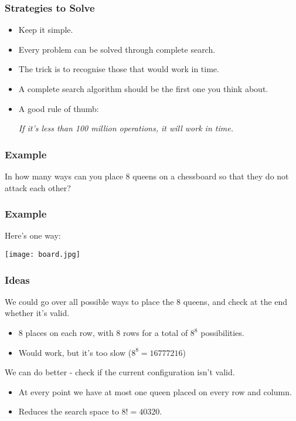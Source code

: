 \documentclass{beamer}
\begin{document}
\begin{frame}
    \frametitle{Strategies to Solve}
    \begin{itemize}
            \pause
        \item Keep it simple.
            \pause
        \item Every problem can be solved through complete search.
            \pause
        \item The trick is to recognise those that would work in time.
            \pause
        \item A complete search algorithm should be the first one you think about.
            \pause
        \item A good rule of thumb:

            \pause
        \vspace{5mm}
        \emph{If it's less than 100 million operations, it will work in time.}
    \end{itemize}
\end{frame}

\begin{frame}
    \frametitle{Example}
    \Large In how many ways can you place 8 queens on a chessboard so that they do not attack each other?

\end{frame}

\begin{frame}
    \frametitle{Example}
    Here's one way:

    \begin{center}
        \texttt{[image: board.jpg]}
    \end{center}
\end{frame}

\begin{frame}
    \frametitle{Ideas}

    We could go over all possible ways to place the 8 queens, and check at the end whether it's valid.
    
    \begin{itemize}
            \pause
        \item 8 places on each row, with 8 rows for a total of $8^8$ possibilities.
            \pause
        \item Would work, but it's too slow ($8^8 = 16777216$)
            \pause
    \end{itemize}
        
    \pause
    We can do better \pause - check if the current configuration isn't valid.

    \begin{itemize}
            \pause
        \item At every point we have at most one queen placed on every row and column.
            \pause
        \item Reduces the search space to $8! = 40320$.
    \end{itemize}
\end{frame}
\end{document}
